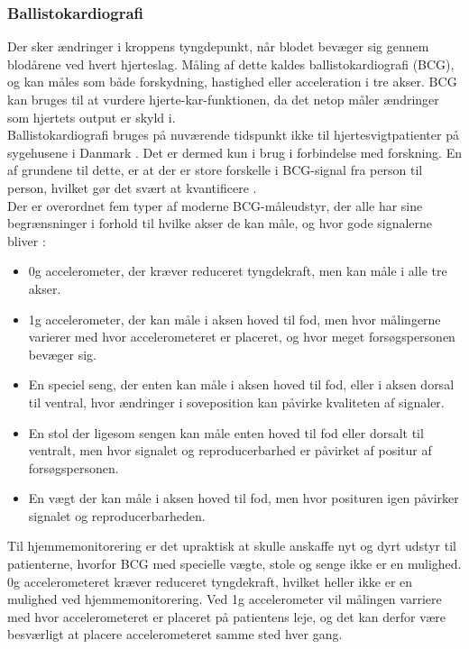 \subsubsection{Ballistokardiografi}
Der sker ændringer i kroppens tyngdepunkt, når blodet bevæger sig gennem blodårene ved hvert hjerteslag. Måling af dette kaldes ballistokardiografi (BCG), og kan måles som både forskydning, hastighed eller acceleration i tre akser. BCG kan bruges til at vurdere hjerte-kar-funktionen, da det netop måler ændringer som hjertets output er skyld i. \citep{inan2015}\\
Ballistokardiografi bruges på nuværende tidspunkt ikke til hjertesvigtpatienter på sygehusene i Danmark \citep{DCS}. Det er dermed kun i brug i forbindelse med forskning. En af grundene til dette, er at der er store forskelle i BCG-signal fra person til person, hvilket gør det svært at kvantificere \citep{inan2009}.\\
Der er overordnet fem typer af moderne BCG-måleudstyr, der alle har sine begrænsninger i forhold til hvilke akser de kan måle, og hvor gode signalerne bliver \citep{inan2015}:
\begin{itemize}
    \item 0g accelerometer, der kræver reduceret tyngdekraft, men kan måle i alle tre akser.
    \item 1g accelerometer, der kan måle i aksen hoved til fod, men hvor målingerne varierer med hvor accelerometeret er placeret, og hvor meget forsøgspersonen bevæger sig.
    \item En speciel seng, der enten kan måle i aksen hoved til fod, eller i aksen dorsal til ventral, hvor ændringer i soveposition kan påvirke kvaliteten af signaler.
    \item En stol der ligesom sengen kan måle enten hoved til fod eller dorsalt til ventralt, men hvor signalet og reproducerbarhed er påvirket af positur af forsøgspersonen.
    \item En vægt der kan måle i aksen hoved til fod, men hvor posituren igen påvirker signalet og reproducerbarheden. 
\end{itemize}

Til hjemmemonitorering er det upraktisk at skulle anskaffe nyt og dyrt udstyr til patienterne, hvorfor BCG med specielle vægte, stole og senge ikke er en mulighed. 0g accelerometeret kræver reduceret tyngdekraft, hvilket heller ikke er en mulighed ved hjemmemonitorering. Ved 1g accelerometer vil målingen varriere med hvor accelerometeret er placeret på patientens leje, og det kan derfor være besværligt at placere accelerometeret samme sted hver gang.

